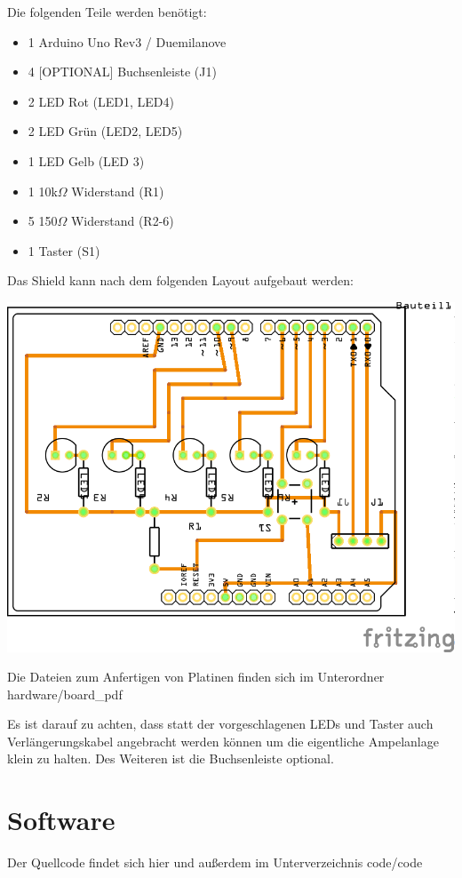 \documentclass[halfparskip]{scrartcl}
\begin{document}
Die folgenden Teile werden benötigt:
\begin{itemize}
    \item 1	Arduino Uno Rev3 / Duemilanove
    \item 4   [OPTIONAL] Buchsenleiste (J1)
    \item 2	LED Rot (LED1, LED4)
    \item 2	LED Grün (LED2, LED5)
    \item 1	LED Gelb (LED 3)
    \item 1	10k$\Omega$ Widerstand (R1)
    \item 5	150$\Omega$ Widerstand (R2-6)
    \item 1	Taster (S1)
\end{itemize}

Das Shield kann nach dem folgenden Layout aufgebaut werden:
\begin{center}
    \includegraphics[width=1\textwidth]{hardware/board}
\end{center}
Die Dateien zum Anfertigen von Platinen finden sich im Unterordner hardware/board\_pdf

Es ist darauf zu achten, dass statt der vorgeschlagenen LEDs und Taster auch Verlängerungskabel angebracht werden können um die eigentliche Ampelanlage klein zu halten. Des Weiteren ist die Buchsenleiste optional. 

\section{Software}
\label{sec:software}
Der Quellcode findet sich hier und außerdem im Unterverzeichnis code/code
\end{document}

